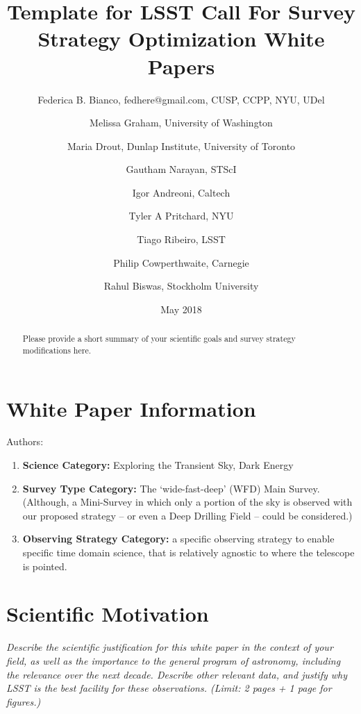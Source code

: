 \documentclass[11pt]{article}
\title{Template for LSST Call For Survey Strategy Optimization White Papers}
\author{}
\date{May 2018}
\begin{document}
\maketitle

\begin{abstract}

Please provide a short summary of your scientific goals and survey strategy modifications here.
\end{abstract}

\section{White Paper Information}
Authors: 

\noindent
\author{Federica B. Bianco, fedhere@gmail.com, CUSP, CCPP, NYU, UDel }

\noindent
\author{Melissa Graham, University of Washington}

\noindent
\author{Maria Drout, Dunlap Institute, University of Toronto}

\noindent
\author{Gautham Narayan, STScI}

\noindent
\author{Igor Andreoni, Caltech}

\noindent
\author{Tyler A Pritchard, NYU} 

\noindent
\author{Tiago Ribeiro, LSST}

\noindent
\author{Philip Cowperthwaite, Carnegie}

\noindent
\author{Rahul Biswas, Stockholm University}

\begin{enumerate} 
\item {\bf Science Category:} Exploring the Transient Sky, Dark Energy
\item {\bf Survey Type Category:} 
The `wide-fast-deep' (WFD) Main Survey. (Although, a Mini-Survey in which only a portion of the sky is observed with our proposed strategy -- or even a Deep Drilling Field --  could be considered.) 
\item {\bf Observing Strategy Category:} 
   a specific observing strategy to enable specific time domain science, that is relatively agnostic to where the telescope is pointed. 
\end{enumerate}  


\clearpage
\section{Scientific Motivation}
\begin{footnotesize}
{\it Describe the scientific justification for this white paper in the context of your field, as well as the importance to the general program of astronomy, including the relevance over the next decade. Describe other relevant data, and justify why LSST is the best facility for these observations. (Limit: 2 pages + 1 page for figures.)}
\end{footnotesize}
\end{document}
